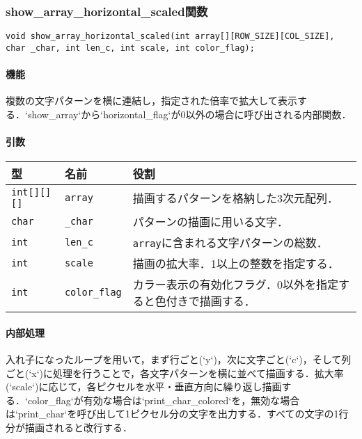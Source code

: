 \documentclass[uplatex]{jsarticle}
\begin{document}
\subsubsection{show\_array\_horizontal\_scaled関数}
\begin{verbatim}
void show_array_horizontal_scaled(int array[][ROW_SIZE][COL_SIZE], char _char, int len_c, int scale, int color_flag);
\end{verbatim}
\paragraph{機能}
複数の文字パターンを横に連結し，指定された倍率で拡大して表示する．`show\_array`から`horizontal\_flag`が0以外の場合に呼び出される内部関数．

\paragraph{引数}
\begin{center}
    \begin{tabular}{|l|l|p{7cm}|}
        \hline
        \textbf{型} & \textbf{名前} & \textbf{役割} \\ \hline
        \texttt{int[][][]} & \texttt{array} & 描画するパターンを格納した3次元配列． \\ \hline
        \texttt{char} & \texttt{\_char} & パターンの描画に用いる文字． \\ \hline
        \texttt{int} & \texttt{len\_c} & \texttt{array}に含まれる文字パターンの総数． \\ \hline
        \texttt{int} & \texttt{scale} & 描画の拡大率．1以上の整数を指定する． \\ \hline
        \texttt{int} & \texttt{color\_flag} & カラー表示の有効化フラグ．0以外を指定すると色付きで描画する． \\ \hline
    \end{tabular}
\end{center}

\paragraph{内部処理}
入れ子になったループを用いて，まず行ごと(`y`)，次に文字ごと(`c`)，そして列ごと(`x`)に処理を行うことで，各文字パターンを横に並べて描画する．拡大率(`scale`)に応じて，各ピクセルを水平・垂直方向に繰り返し描画する．`color\_flag`が有効な場合は`print\_char\_colored`を，無効な場合は`print\_char`を呼び出して1ピクセル分の文字を出力する．すべての文字の1行分が描画されると改行する．
\end{document}
